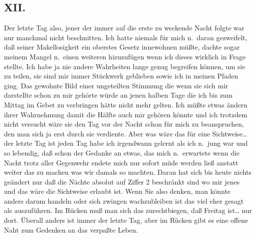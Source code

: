 \documentclass[
]{article}
\author{}
\date{\vspace{-2.5em}}
\begin{document}
\subsection{XII.}\label{xii.}

Der letzte Tag also, jener der immer auf die erste zu weckende Nacht
folgte war nur manchmal nicht beschnitten. Ich hatte niemals für mich
n.~daran gezweifelt, daß seiner Makellosigkeit ein oberstes Gesetz
innewohnen müßte, dachte sogar meinem Mangel n.~einen weiteren
hizuzufügen wenn ich dieses wirklich in Frage stellte. Ich habe ja nie
andere Wahrheiten lange genug begreifen können, um sie zu teilen, sie
sind mir immer Stückwerk geblieben sowie ich in meinen Pfaden ging. Das
gewohnte Bild einer ungeteilten Stimmung die wenn sie sich mir
darstellte schon zu mir gehörte würde an jenen halben Tage die ich bis
zum Mittag im Gebet zu verbringen hätte nicht mehr gelten. Ich müßte
etwas ändern ihrer Wahrnehmung damit die Hälfte auch mir gehören könnte
und ich trotzdem nicht versucht wäre sie den Tag vor der Nacht schon für
mich zu beanspruchen, den man sich ja erst durch sie verdiente. Aber was
wäre das für eine Sichtweise\ldots{} der letzte Tag ist jeden Tag habe
ich irgendwann gelernt als ich n.~jung war und so lebendig, daß schon
der Gedanke an etwas, das mich n.~erwartete wenn die Nacht trotz aller
Gegenwehr endete mich nur sofort müde werden ließ anstatt weiter das zu
machen was wir damals so machten. Daran hat sich bis heute nichts
geändert nur daß die Nächte absolut auf Ziffer 2 beschränkt sind wo mir
jenes und das wäre die Sichtweise erlaubt ist. Wenn Sie also denken, man
könnte anders darum handeln oder sich zwingen wachzubleiben ist das viel
eher gesagt als auszuführen. Im Rücken muß man sich das zurechtbiegen,
daß Freitag ist\ldots{} nur dort. Überall anders ist immer der letzte
Tag, aber im Rücken gibt es eine offene Naht zum Gedenken an das
verpaßte Leben.
\end{document}
